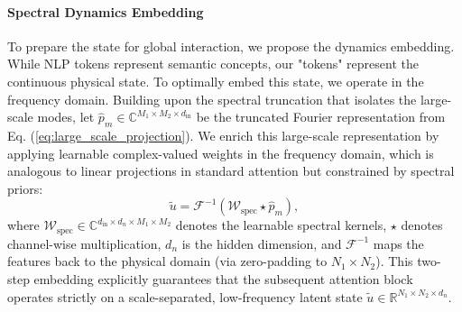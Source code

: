\documentclass[final,3p,times]{elsarticle}
\begin{document}
\paragraph{Spectral Dynamics Embedding}
To prepare the state for global interaction, we propose the dynamics embedding. While NLP tokens represent semantic concepts, our "tokens" represent the continuous physical state. To optimally embed this state, we operate in the frequency domain. 
Building upon the spectral truncation that isolates the large-scale modes, let $\hat{p}_m \in \mathbb{C}^{M_1 \times M_2 \times d_{\text{in}}}$ be the truncated Fourier representation from Eq. (\ref{eq:large_scale_projection}). We enrich this large-scale representation by applying learnable complex-valued weights in the frequency domain, which is analogous to linear projections in standard attention but constrained by spectral priors:
\begin{equation}
\tilde{u} = \mathcal{F}^{-1}\left( \mathcal{W}_{\text{spec}} \star \hat{p}_m \right),
\label{eq:spectral_embedding}
\end{equation}
where $\mathcal{W}_{\text{spec}} \in \mathbb{C}^{d_{\text{in}} \times d_{n} \times M_1 \times M_2}$ denotes the learnable spectral kernels, $\star$ denotes channel-wise multiplication, $d_n$ is the hidden dimension, and $\mathcal{F}^{-1}$ maps the features back to the physical domain (via zero-padding to $N_1 \times N_2$). This two-step embedding explicitly guarantees that the subsequent attention block operates strictly on a scale-separated, low-frequency latent state $\tilde{u} \in \mathbb{R}^{N_1 \times N_2 \times d_n}$.
\end{document}
